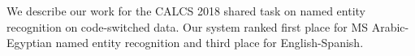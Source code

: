 We describe our work for the CALCS 2018 shared task on named entity recognition on code-switched data. Our system ranked first place for MS Arabic-Egyptian named entity recognition and third place for English-Spanish.
